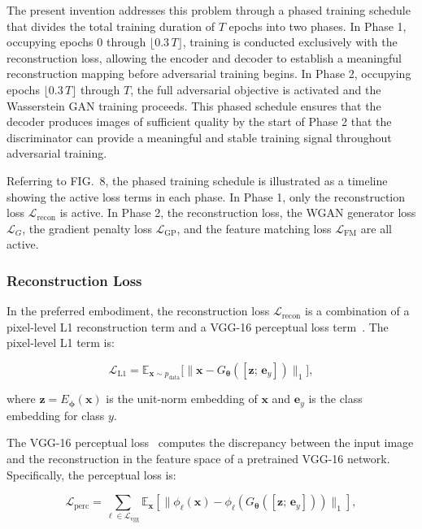 \documentclass[12pt,letterpaper]{article}
\newcommand{\bz}{\mathbf{z}}
\newcommand{\bx}{\mathbf{x}}
\newcommand{\btheta}{\bm{\theta}}
\newcommand{\bphi}{\bm{\phi}}
\newcommand{\EE}{\mathbb{E}}
\begin{document}
The present invention addresses this problem through a phased training schedule
that divides the total training duration of $T$ epochs into two phases. In
Phase 1, occupying epochs $0$ through $\lfloor 0.3\,T \rfloor$, training is
conducted exclusively with the reconstruction loss, allowing the encoder and
decoder to establish a meaningful reconstruction mapping before adversarial
training begins. In Phase 2, occupying epochs $\lfloor 0.3\,T \rfloor$ through
$T$, the full adversarial objective is activated and the Wasserstein GAN
training proceeds. This phased schedule ensures that the decoder produces
images of sufficient quality by the start of Phase 2 that the discriminator
can provide a meaningful and stable training signal throughout adversarial
training.

Referring to FIG.\ 8, the phased training schedule is illustrated as a
timeline showing the active loss terms in each phase. In Phase 1, only the
reconstruction loss $\mathcal{L}_{\text{recon}}$ is active. In Phase 2, the
reconstruction loss, the WGAN generator loss $\mathcal{L}_G$, the gradient
penalty loss $\mathcal{L}_{\text{GP}}$, and the feature matching loss
$\mathcal{L}_{\text{FM}}$ are all active.

\subsubsection{Reconstruction Loss}

In the preferred embodiment, the reconstruction loss $\mathcal{L}_{\text{recon}}$
is a combination of a pixel-level L1 reconstruction term and a VGG-16
perceptual loss term~\cite{johnson2016}. The pixel-level L1 term is:

\begin{equation}
  \mathcal{L}_{\text{L1}} = \EE_{\bx \sim p_{\text{data}}}\!\bigl[\|\bx - G_{\btheta}([\bz;\,\bm{e}_y])\|_1\bigr],
  \label{eq:l1}
\end{equation}

\noindent where $\bz = E_{\bphi}(\bx)$ is the unit-norm embedding of $\bx$ and
$\bm{e}_y$ is the class embedding for class $y$.

The VGG-16 perceptual loss~\cite{simonyan2015,johnson2016} computes the
discrepancy between the input image and the reconstruction in the feature space
of a pretrained VGG-16 network. Specifically, the perceptual loss is:

\begin{equation}
  \mathcal{L}_{\text{perc}} = \sum_{\ell \in \mathcal{L}_{\text{vgg}}}
    \EE_{\bx}\!\left[\bigl\|\phi_\ell(\bx) - \phi_\ell(G_{\btheta}([\bz;\,\bm{e}_y]))\bigr\|_1\right],
  \label{eq:perc}
\end{equation}
\end{document}
